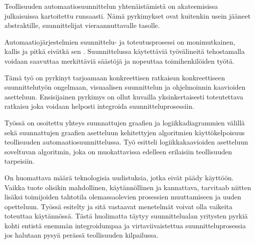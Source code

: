 \documentclass[finnish,12pt]{article}
\begin{document}
Teollisuuden automaatiosuunnittelun yhtenäistämistä on akateemisissa julkaisuissa kartoitettu runsaasti.
Nämä pyrkimykset ovat kuitenkin usein jääneet abstraktille, suunnittelijat vieraannuttavalle tasolle.

Automaatiojärjestelmien suunnittelu- ja toteutusprosessi on monimutkainen, kallis ja pitkä eivätkä sen .
Suunnittelussa käytettäviä työvälineitä tehostamalla voidaan saavuttaa merkittäviä säästöjä ja nopeuttaa toimihenkilöiden työtä.

Tämä työ on pyrkinyt tarjoamaan konkreettisen ratkaisun konkreettiseen suunnittelutyön ongelmaan, visuaalisen suunnittelun ja ohjelmoinnin kaavioiden asetteluun.
Ensisijainen pyrkimys on ollut kuvailla yksinkertaisesti toteutettava ratkaisu joka voidaan helposti integroida suunnitteluprosessiin.

Työssä on osoitettu yhteys suunnattujen graafien ja logiikkadiagrammien välillä sekä suunnattujen graafien asetteluun kehitettyjen algoritmien käyttökelpoisuus teollisuuden automaatiosuunnittelussa.
Työ esitteli logiikkakaavioiden asetteluun soveltuvan algoritmin, joka on muokattavissa edelleen erilaisiin teollisuuden tarpeisiin.

On huomattava määrä teknologisia uudistuksia, jotka eivät päädy käyttöön.
Vaikka tuote olisikin mahdollinen, käytännöllinen ja kannattava, tarvitaab niitten lisäksi toimijoiden tahtotila olemassaolevien prosessien muuttamiseen ja uuden opetteluun.
Työssä esitelty ja sitä vastaavat menetelmät voivat olla vaikeita toteuttaa käytännössä.
Tästä huolimatta täytyy suunnittelualan yritysten pyrkiä kohti entistä enemmän integroidumpaa ja virtaviivaistettua suunnitteluprosessia jos halutaan pysyä perässä teollisuuden kilpailussa.


\clearpage
{}


\end{document}
